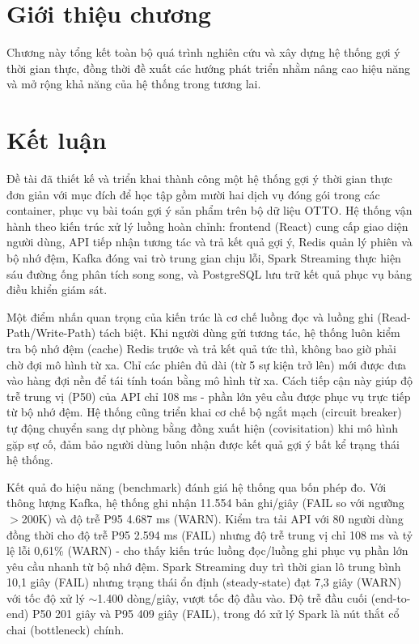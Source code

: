 \documentclass[../BTL.tex]{subfiles}
\begin{document}
\section*{Giới thiệu chương}
Chương này tổng kết toàn bộ quá trình nghiên cứu và xây dựng hệ thống gợi ý thời gian thực, đồng thời đề xuất các hướng phát triển nhằm nâng cao hiệu năng và mở rộng khả năng của hệ thống trong tương lai.

\section{Kết luận}

Đề tài đã thiết kế và triển khai thành công một hệ thống gợi ý thời gian thực đơn giản với mục đích để học tập gồm mười hai dịch vụ đóng gói trong các container, phục vụ bài toán gợi ý sản phẩm trên bộ dữ liệu OTTO. Hệ thống vận hành theo kiến trúc xử lý luồng hoàn chỉnh: frontend (React) cung cấp giao diện người dùng, API tiếp nhận tương tác và trả kết quả gợi ý, Redis quản lý phiên và bộ nhớ đệm, Kafka đóng vai trò trung gian chịu lỗi, Spark Streaming thực hiện sáu đường ống phân tích song song, và PostgreSQL lưu trữ kết quả phục vụ bảng điều khiển giám sát.

Một điểm nhấn quan trọng của kiến trúc là cơ chế luồng đọc và luồng ghi (Read-Path/Write-Path) tách biệt. Khi người dùng gửi tương tác, hệ thống luôn kiểm tra bộ nhớ đệm (cache) Redis trước và trả kết quả tức thì, không bao giờ phải chờ đợi mô hình từ xa. Chỉ các phiên đủ dài (từ 5 sự kiện trở lên) mới được đưa vào hàng đợi nền để tái tính toán bằng mô hình từ xa. Cách tiếp cận này giúp độ trễ trung vị (P50) của API chỉ 108 ms - phần lớn yêu cầu được phục vụ trực tiếp từ bộ nhớ đệm. Hệ thống cũng triển khai cơ chế bộ ngắt mạch (circuit breaker) tự động chuyển sang dự phòng bằng đồng xuất hiện (covisitation) khi mô hình gặp sự cố, đảm bảo người dùng luôn nhận được kết quả gợi ý bất kể trạng thái hệ thống.

Kết quả đo hiệu năng (benchmark) đánh giá hệ thống qua bốn phép đo. Với thông lượng Kafka, hệ thống ghi nhận 11.554 bản ghi/giây (FAIL so với ngưỡng $>$200K) và độ trễ P95 4.687 ms (WARN). Kiểm tra tải API với 80 người dùng đồng thời cho độ trễ P95 2.594 ms (FAIL) nhưng độ trễ trung vị chỉ 108 ms và tỷ lệ lỗi 0,61\% (WARN) - cho thấy kiến trúc luồng đọc/luồng ghi phục vụ phần lớn yêu cầu nhanh từ bộ nhớ đệm. Spark Streaming duy trì thời gian lô trung bình 10,1 giây (FAIL) nhưng trạng thái ổn định (steady-state) đạt 7,3 giây (WARN) với tốc độ xử lý $\sim$1.400 dòng/giây, vượt tốc độ đầu vào. Độ trễ đầu cuối (end-to-end) P50 201 giây và P95 409 giây (FAIL), trong đó xử lý Spark là nút thắt cổ chai (bottleneck) chính.
\end{document}
